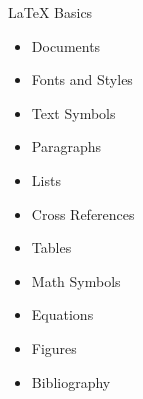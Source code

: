 	\begin{frame}{LaTeX{} Basics}
		\begin{itemize}
        	\item Documents
        	\item Fonts and Styles
            \item Text Symbols
            \item Paragraphs
            \item Lists
            \item Cross References
            \item Tables
            \item Math Symbols
        	\item Equations
            \item Figures
            \item Bibliography
		\end{itemize}
	\end{frame}

